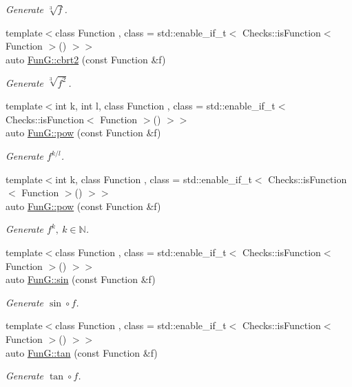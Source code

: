 \begin{DoxyCompactItemize}
\begin{DoxyCompactList}\small\item\em Generate $ \sqrt[3]{f} $. \end{DoxyCompactList}\item 
{\footnotesize template$<$class Function , class  = std\-::enable\-\_\-if\-\_\-t$<$ Checks\-::is\-Function$<$ Function $>$() $>$$>$ }\\auto \hyperlink{group__CMathGroup_gafd27322fb64c6df3366f384c93819a06}{Fun\-G\-::cbrt2} (const Function \&f)
\begin{DoxyCompactList}\small\item\em Generate $ \sqrt[3]{f^2}$. \end{DoxyCompactList}\item 
{\footnotesize template$<$int k, int l, class Function , class  = std\-::enable\-\_\-if\-\_\-t$<$ Checks\-::is\-Function$<$ Function $>$() $>$$>$ }\\auto \hyperlink{group__CMathGroup_gaecae6fa60bbfc0eb1867581ee4577d4e}{Fun\-G\-::pow} (const Function \&f)
\begin{DoxyCompactList}\small\item\em Generate $ f^{k/l} $. \end{DoxyCompactList}\item 
{\footnotesize template$<$int k, class Function , class  = std\-::enable\-\_\-if\-\_\-t$<$ Checks\-::is\-Function$<$ Function $>$() $>$$>$ }\\auto \hyperlink{group__CMathGroup_gab52ffe2efd379aad7ea322de46103465}{Fun\-G\-::pow} (const Function \&f)
\begin{DoxyCompactList}\small\item\em Generate $ f^k,\ k\in\mathbb{N}$. \end{DoxyCompactList}\item 
{\footnotesize template$<$class Function , class  = std\-::enable\-\_\-if\-\_\-t$<$ Checks\-::is\-Function$<$ Function $>$() $>$$>$ }\\auto \hyperlink{group__CMathGroup_ga663fdbe7a8977cba529c7c33981b7738}{Fun\-G\-::sin} (const Function \&f)
\begin{DoxyCompactList}\small\item\em Generate $ \sin\circ f $. \end{DoxyCompactList}\item 
{\footnotesize template$<$class Function , class  = std\-::enable\-\_\-if\-\_\-t$<$ Checks\-::is\-Function$<$ Function $>$() $>$$>$ }\\auto \hyperlink{group__CMathGroup_gae03f57bd4efb4449ad1dc60cb74c742d}{Fun\-G\-::tan} (const Function \&f)
\begin{DoxyCompactList}\small\item\em Generate $ \tan\circ f $. \end{DoxyCompactList}\end{DoxyCompactItemize}


